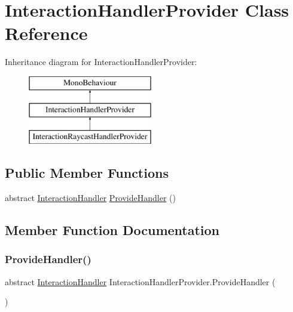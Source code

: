 \hypertarget{class_interaction_handler_provider}{}\section{Interaction\+Handler\+Provider Class Reference}
\label{class_interaction_handler_provider}
Inheritance diagram for Interaction\+Handler\+Provider\+:\begin{figure}[H]
\begin{center}
\leavevmode
\includegraphics[height=3.000000cm]{class_interaction_handler_provider}
\end{center}
\end{figure}
\subsection*{Public Member Functions}
\begin{DoxyCompactItemize}
\item 
abstract \mbox{\hyperlink{class_interaction_handler}{Interaction\+Handler}} \mbox{\hyperlink{class_interaction_handler_provider_a7cd6cb9b81f1504895f121bf0f7d1d97}{Provide\+Handler}} ()
\end{DoxyCompactItemize}


\subsection{Member Function Documentation}
\mbox{\label{class_interaction_handler_provider_a7cd6cb9b81f1504895f121bf0f7d1d97}} 
\subsubsection{\texorpdfstring{Provide\+Handler()}{ProvideHandler()}}
{\footnotesize\ttfamily abstract \mbox{\hyperlink{class_interaction_handler}{Interaction\+Handler}} Interaction\+Handler\+Provider.\+Provide\+Handler (\begin{DoxyParamCaption}{ }\end{DoxyParamCaption})\hspace{0.3cm}{\ttfamily [pure virtual]}}




